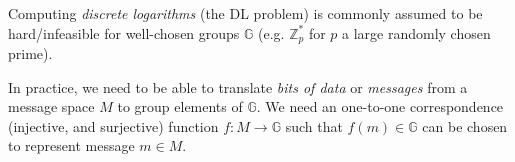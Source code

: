 \documentclass[11pt]{article}
\newcommand{\Zp}{\mathbb{Z}^{\ast}_p}
\newcommand{\G}{\mathbb{G}}
\begin{document}
Computing \emph{discrete logarithms} (the DL problem) is commonly assumed to be
hard/infeasible for well-chosen groups $\G$ (e.g. $\Zp$ for $p$ a large randomly
chosen prime).

In practice, we need to be able to translate \emph{bits of data} or
\emph{messages} from a message space $M$ to group elements of $\G$. We need an
one-to-one correspondence (injective, and surjective) function $f : M
\rightarrow \G$ such that $f(m) \in \G$ can be chosen to represent message $m
\in M$.
\end{document}
